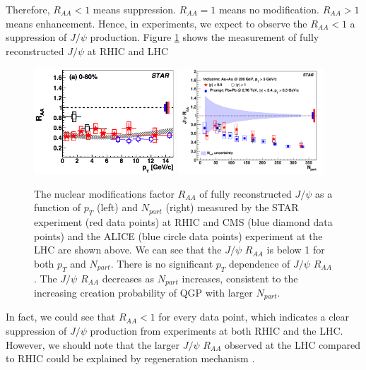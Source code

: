 Therefore, $R_{AA} < 1$ means suppression. $R_{AA} =1$ means no modification. $R_{AA} > 1$ means enhancement. Hence, in experiments, we expect to observe the $R_{AA} < 1$ a suppression of $J/\psi$ production. Figure \ref{JPsiSupp} shows the measurement of fully reconstructed $J/\psi$ at RHIC and LHC \cite{STARJpsi}


\begin{figure}[hbtp]
\begin{center}
\includegraphics[width=0.47\textwidth]{Figures/Chapter1/STARPt.png}
\includegraphics[width=0.487\textwidth]{Figures/Chapter1/STARNPart.png}
\caption{The nuclear modifications factor $R_{AA}$ of fully reconstructed $J/\psi$ as a function of $p_{T}$ (left) and $N_{part}$ (right) measured by the STAR experiment (red data points) at RHIC and CMS (blue diamond data points) and the ALICE (blue circle data points) experiment at the LHC are shown above. We can see that the $J/\psi$ $R_{AA}$ is below 1 for both $p_T$ and $N_{part}$. There is no significant $p_T$ dependence of $J/\psi$ $R_{AA}$. The $J/\psi$ $R_{AA}$ decreases as $N_{part}$ increases, consistent to the increasing creation probability of QGP with larger $N_{part}$.}
\label{JPsiSupp}
\end{center}
\end{figure} 

In fact, we could see that $R_{AA} < 1$ for every data point, which indicates a clear suppression of $J/\psi$ production from experiments at both RHIC and the LHC. However, we should note that the larger $J/\psi$ $R_{AA}$ observed at the LHC compared to RHIC could be explained by regeneration mechanism \cite{JPsiRegen}. %

